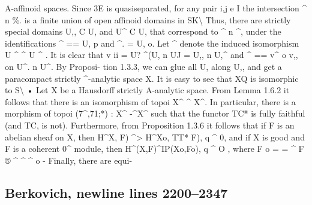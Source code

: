 \documentclass[
  10pt,
]{article}
\newenvironment{Shaded}{}{}
\newcommand{\NormalTok}[1]{#1}
\begin{document}
\begin{Shaded}
\begin{Highlighting}[]
\NormalTok{A{-}affinoid spaces. Since 3E is quasiseparated, for any pair i,j e I the intersection \^{} n \%.}
\NormalTok{is a finite union of open affinoid domains in SK\textbackslash{} Thus, there are strictly special domains}
\NormalTok{U,, C U, and U\^{} C U, that correspond to \^{} n \^{}, under the identifications \^{} == U, p}
\NormalTok{and \^{}. = U, o. Let \^{} denote the induced isomorphism U \^{} \^{} U \^{} . It is clear that}
\NormalTok{v}
\NormalTok{  ii = U? \^{}(U, n UJ = U,, n U,\^{} and \^{} == v\^{} o v,, on U\^{}. n U\^{}. By Proposi{-}}
\NormalTok{tion 1.3.3, we can glue all U, along U,, and get a paracompact strictly \^{}{-}analytic}
\NormalTok{space X. It is easy to see that XQ is isomorphic to S\textbackslash{} •}
\NormalTok{       Let X be a Hausdorff strictly A{-}analytic space. From Lemma 1.6.2 it follows}
\NormalTok{that there is an isomorphism of topoi X\^{} \^{} X\^{}. In particular, there is a morphism of}
\NormalTok{topoi (7\^{},71;*) : X\^{} {-}\^{}X\^{} such that the functor TC* is fully faithful (and TC, is not).}
\NormalTok{Furthermore, from Proposition 1.3.6 it follows that if F is an abelian sheaf on X, then}
\NormalTok{H\^{}X, F) \^{}\textgreater{} H\^{}Xo, TT* F), q \^{} 0, and if X is good and F is a coherent 0\^{} module, then}
\NormalTok{H\^{}(X,F)\^{}IP(Xo,Fo), q \^{} O , where F o = = \^{} F ® \^{} \^{} \^{} o {-} Finally, there are equi{-}}
\end{Highlighting}
\end{Shaded}

\subsection{Berkovich, newline lines
2200--2347}\label{berkovich-newline-lines-22002347}
\end{document}
